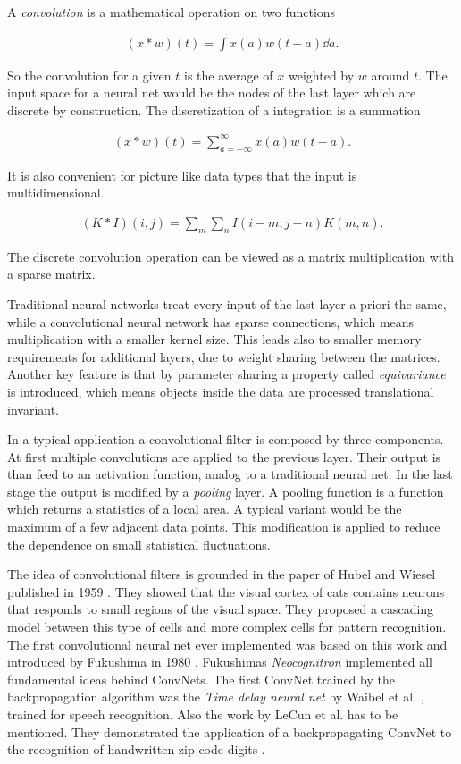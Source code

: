 \documentclass[12pt, a4paper]{thesis}
\begin{document}
A \emph{convolution} is a mathematical operation on two functions

\begin{align}
  (x * w)(t) = \int x(a) w(t-a)\dd a.
\end{align}

So the convolution for a given \(t\) is the average of \(x\) weighted
by \(w\) around \(t\). The input space for a neural net would be the
nodes of the last layer which are discrete by construction. The
discretization of a integration is a summation

\begin{align}
  (x * w)(t) = \sum^{\infty}_{a=-\infty} x(a) w(t-a).
\end{align}

It is also convenient for picture like data types that the input is
multidimensional.

\begin{align}
  (K * I)(i,j) = \sum_{m} \sum_{n} I(i-m,j-n) K(m,n).
\end{align}

The discrete convolution operation can be viewed as a matrix
multiplication with a sparse matrix.

Traditional neural networks treat every input of the last layer a
priori the same, while a convolutional neural network has sparse
connections, which means multiplication with a smaller kernel
size. This leads also to smaller memory requirements for additional
layers, due to weight sharing between the matrices.  Another key
feature is that by parameter sharing a property called
\emph{equivariance} is introduced, which means objects inside the data
are processed translational invariant.

In a typical application a convolutional filter is composed by three
components.  At first multiple convolutions are applied to the
previous layer. Their output is than feed to an activation function,
analog to a traditional neural net.  In the last stage the output is
modified by a \emph{pooling} layer. A pooling function is a function
which returns a statistics of a local area. A typical variant would be
the maximum of a few adjacent data points. This modification is
applied to reduce the dependence on small statistical fluctuations.

The idea of convolutional filters is grounded in the paper of Hubel
and Wiesel published in 1959 \cite{hubel59}. They showed that the
visual cortex of cats contains neurons that responds to small regions
of the visual space. They proposed a cascading model between this type
of cells and more complex cells for pattern recognition. The first
convolutional neural net ever implemented was based on this work and
introduced by Fukushima in 1980 \cite{neocognitron}. Fukushimas
\emph{Neocognitron} implemented all fundamental ideas behind ConvNets.
The first ConvNet trained by the backpropagation algorithm was the
\emph{Time delay neural net} by Waibel et al.
\cite{hampshire89,waibel90}, trained for speech recognition. Also the
work by LeCun et al. has to be mentioned. They demonstrated the
application of a backpropagating ConvNet to the recognition of
handwritten zip code digits \cite{lecun89}.
\end{document}
